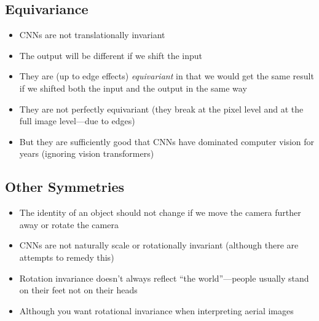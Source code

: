 \begin{slide}
\section{Equivariance}

\begin{PauseHighLight}
  \begin{itemize}
  \item CNNs are not translationally invariant\pause
  \item The output will be different if we shift the input\pause
  \item They are (up to edge effects) \emph{equivariant} in that we would get
    the same result if we shifted both the input and the output in the
    same way\pause
  \item They are not perfectly equivariant (they break at the pixel
    level and at the full image level---due to edges)\pause
  \item But they are sufficiently good that CNNs have dominated computer
    vision for years\pause{} (ignoring vision transformers)\pauseb
  \end{itemize}
\end{PauseHighLight}

\end{slide}


\begin{slide}
\section{Other Symmetries}

\begin{PauseHighLight}
  \begin{itemize}
  \item The identity of an object should not change if we move the
    camera further away or rotate the camera\pause
  \item CNNs are not naturally scale or rotationally invariant\pause{}
    (although there are attempts to remedy this)\pauseb
  \item Rotation invariance doesn't always reflect ``the
    world''\pause---people usually stand on their feet not on their
    heads\pause
  \item Although you want rotational invariance when interpreting
    aerial images\pause
  \end{itemize}
\end{PauseHighLight}

\end{slide}

